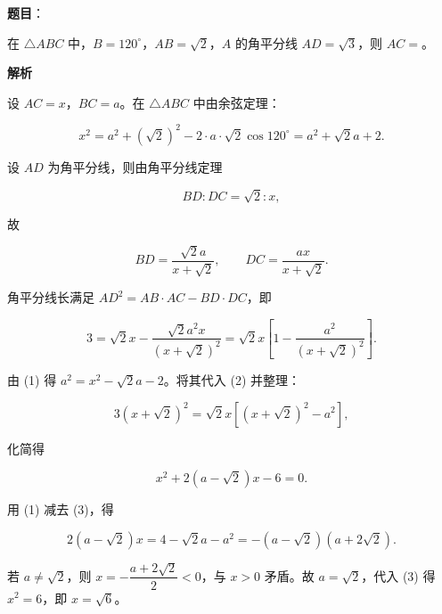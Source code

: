 \begin{answer}

\textbf{题目}：

在 $\triangle ABC$ 中，$B=120^\circ$，$AB=\sqrt{2}$，$A$ 的角平分线 $AD=\sqrt{3}$，则 $AC=$\gkblank{}。

\textbf{解析}

设 $AC=x$，$BC=a$。在 $\triangle ABC$ 中由余弦定理：

\nopagebreak[4]
\[
x^{2}=a^{2}+(\sqrt{2})^{2}-2\cdot a\cdot\sqrt{2}\cos 120^\circ
=a^{2}+\sqrt{2}a+2. \tag{1}
\]

设 $AD$ 为角平分线，则由角平分线定理

\nopagebreak[4]
\[
BD:DC=\sqrt{2}:x,
\]

故

\nopagebreak[4]
\[
BD=\frac{\sqrt{2}a}{x+\sqrt{2}},\qquad DC=\frac{ax}{x+\sqrt{2}}.
\]

角平分线长满足 $AD^{2}=AB\cdot AC-BD\cdot DC$，即

\nopagebreak[4]
\[
3=\sqrt{2}x-\frac{\sqrt{2}a^{2}x}{(x+\sqrt{2})^{2}}
=\sqrt{2}x\left[1-\frac{a^{2}}{(x+\sqrt{2})^{2}}\right]. \tag{2}
\]

由 (1) 得 $a^{2}=x^{2}-\sqrt{2}a-2$。将其代入 (2) 并整理：

\nopagebreak[4]
\[
3(x+\sqrt{2})^{2}=\sqrt{2}x\left[(x+\sqrt{2})^{2}-a^{2}\right],
\]

化简得

\nopagebreak[4]
\[
x^{2}+2(a-\sqrt{2})x-6=0. \tag{3}
\]

用 (1) 减去 (3)，得

\nopagebreak[4]
\[
2(a-\sqrt{2})x=4-\sqrt{2}a-a^{2}=-(a-\sqrt{2})(a+2\sqrt{2}).
\]

若 $a\ne\sqrt{2}$，则 $x=-\dfrac{a+2\sqrt{2}}{2}<0$，与 $x>0$ 矛盾。故 $a=\sqrt{2}$，代入 (3) 得 $x^{2}=6$，即 $x=\sqrt{6}$。


\end{answer}
